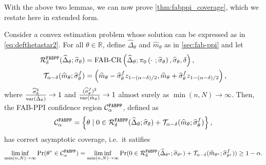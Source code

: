 With the above two lemmas, we can now prove \cref{thm:fabppi_coverage}, which we restate here in extended form.
\begin{theorem}
    Consider a convex estimation problem whose solution can be expressed as in \cref{eq:defthetastar2}. For all $\theta \in \mathbb{R}$, define $\widehat{\Delta}_\theta$ and $\widehat{m}_\theta$ as in \cref{sec:fab-ppi} and let
    \begin{align*}
        \mathcal R^{\mathrm{\texttt{FABPP}}}_\delta(\widehat{\Delta}_\theta; \widehat{\sigma}_\theta ) &= \text{FAB-CR}\left(\widehat{\Delta}_\theta; \pi_{0}\left(\cdot~; \widehat{\sigma}_\theta\right), \widehat{\sigma}_\theta, \delta\right),\nonumber\\
        \mathcal T_{\alpha-\delta}(\widehat m_\theta; \widehat\sigma_\theta^f) &= \left(\widehat{m}_\theta - \widehat\sigma_\theta^f z_{1-(\alpha - \delta) / 2}, \widehat{m}_\theta + \widehat\sigma_\theta^f  z_{1-(\alpha - \delta) / 2}\right),
    \end{align*}
    where $\frac{\widehat{\sigma}_\theta^2}{\mathrm{var}(\hat{\Delta}_\theta)}\to 1$ and $\frac{(\widehat\sigma_\theta^f)^2}{\mathrm{var}(\hat{m}_\theta)}\to 1$ almost surely as $\min(n,N)\to\infty$. Then, the FAB-PPI confidence region $\mathcal C_\alpha^{\mathrm{\texttt{FABPP}}}$, defined as
    \begin{equation*}
        \mathcal C_\alpha^{\mathrm{\texttt{FABPP}}}=\left\{\theta \mid 0\in \mathcal R^{\mathrm{\texttt{FABPP}}}_\delta(\widehat\Delta_\theta; \widehat{\sigma}_\theta) + \mathcal T_{\alpha-\delta}(\widehat m_\theta; \widehat\sigma_\theta^f)\right\},
    \end{equation*}
    has correct asymptotic coverage, i.e.~it satifies
    \begin{equation*}
        \liminf_{\min(n,N) \to \infty} \Pr(\theta^* \in \mathcal C_\alpha^{\mathrm{\texttt{FABPP}}}) = \liminf_{\min(n,N) \to \infty} \Pr(0 \in \mathcal R^{\mathrm{\texttt{FABPP}}}_\delta(\widehat\Delta_{\theta^*}; \widehat{\sigma}_{\theta^\star}) + \mathcal T_{\alpha-\delta}(\widehat m_{\theta^*}; \widehat\sigma_{\theta^\star}^f)) \geq 1 - \alpha.
    \end{equation*}
\end{theorem}
